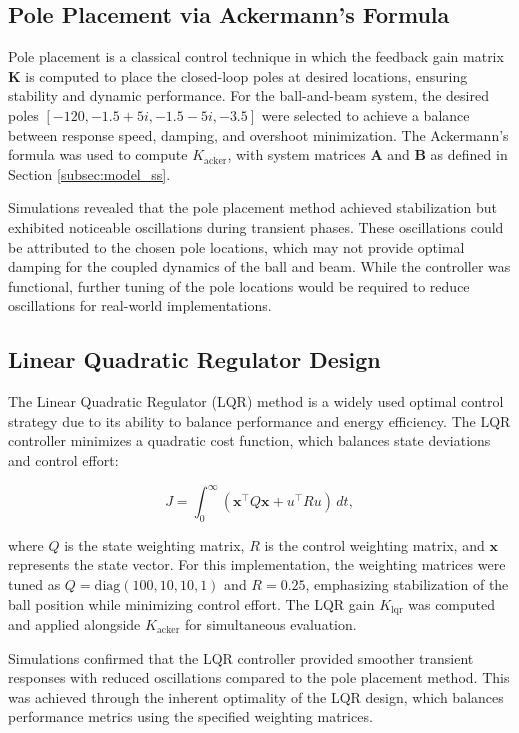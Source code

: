 \documentclass[conference]{IEEEtran}
\begin{document}
\subsection{Pole Placement via Ackermann's Formula}
\label{subsec:control_pp_v_acker}
Pole placement is a classical control technique in which the feedback gain matrix \(\mathbf{K}\) is computed to place the closed-loop poles at desired locations, ensuring stability and dynamic performance. For the ball-and-beam system, the desired poles \([-120, -1.5+5i, -1.5-5i, -3.5]\) were selected to achieve a balance between response speed, damping, and overshoot minimization. The Ackermann's formula was used to compute \(K_{\text{acker}}\), with system matrices \(\mathbf{A}\) and \(\mathbf{B}\) as defined in Section \ref{subsec:model_ss}.

Simulations revealed that the pole placement method achieved stabilization but exhibited noticeable oscillations during transient phases. These oscillations could be attributed to the chosen pole locations, which may not provide optimal damping for the coupled dynamics of the ball and beam. While the controller was functional, further tuning of the pole locations would be required to reduce oscillations for real-world implementations.

\subsection{Linear Quadratic Regulator Design}
\label{subsec:lqr_design}
The Linear Quadratic Regulator (LQR) method is a widely used optimal control strategy due to its ability to balance performance and energy efficiency. The LQR controller minimizes a quadratic cost function, which balances state deviations and control effort:

\begin{equation}
    J = \int_{0}^{\infty} (\mathbf{x}^\top Q \mathbf{x} + u^\top R u) \, dt,
\end{equation}

where \( Q \) is the state weighting matrix, \( R \) is the control weighting matrix, and \( \mathbf{x} \) represents the state vector. For this implementation, the weighting matrices were tuned as \( Q = \text{diag}(100, 10, 10, 1) \) and \( R = 0.25 \), emphasizing stabilization of the ball position while minimizing control effort. The LQR gain \(K_{\text{lqr}}\) was computed and applied alongside \(K_{\text{acker}}\) for simultaneous evaluation.

Simulations confirmed that the LQR controller provided smoother transient responses with reduced oscillations compared to the pole placement method. This was achieved through the inherent optimality of the LQR design, which balances performance metrics using the specified weighting matrices.
\end{document}

